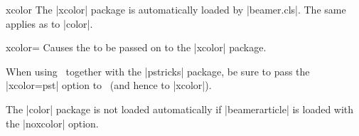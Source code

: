 \begin{package}{{xcolor}}
  \beamernote
  The |xcolor| package is automatically loaded by |beamer.cls|. The same applies as to |color|.

  \begin{classoption}{xcolor={\normalfont{}}}
    Causes the  to be passed on to the |xcolor| package.
  \end{classoption}

  When using \beamer\ together with the |pstricks| package, be sure to pass the |xcolor=pst| option to \beamer\ (and hence to |xcolor|).

  \articlenote
  The |color| package is not loaded automatically if |beamerarticle| is loaded with the |noxcolor| option.
\end{package}
